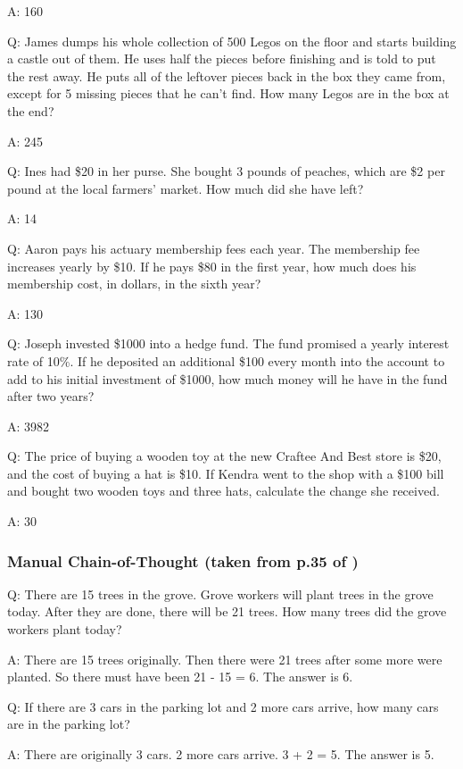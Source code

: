 \documentclass[11pt]{article}
\begin{document}
A: 160

Q: James dumps his whole collection of 500 Legos on the floor and starts building a castle out of them.  He uses half the pieces before finishing and is told to put the rest away.  He puts all of the leftover pieces back in the box they came from, except for 5 missing pieces that he can't find.  How many Legos are in the box at the end?

A: 245

Q: Ines had \$20 in her purse. She bought 3 pounds of peaches, which are \$2 per pound at the local farmers' market. How much did she have left?

A: 14

Q: Aaron pays his actuary membership fees each year. The membership fee increases yearly by \$10. If he pays \$80 in the first year, how much does his membership cost, in dollars, in the sixth year?

A: 130

Q: Joseph invested \$1000 into a hedge fund. The fund promised a yearly interest rate of 10\%. If he deposited an additional \$100 every month into the account to add to his initial investment of \$1000, how much money will he have in the fund after two years?

A: 3982

Q: The price of buying a wooden toy at the new Craftee And Best store is \$20, and the cost of buying a hat is \$10. If Kendra went to the shop with a \$100 bill and bought two wooden toys and three hats, calculate the change she received.

A: 30

\subsubsection*{Manual Chain-of-Thought (taken from p.35 of \citealp{wei_chain--thought_nodate})}

Q: There are 15 trees in the grove. Grove workers will plant trees in the grove today. After they are done, there
will be 21 trees. How many trees did the grove workers plant today?

A: There are 15 trees originally. Then there were 21 trees after some more were planted. So there must have
been 21 - 15 = 6. The answer is 6.

Q: If there are 3 cars in the parking lot and 2 more cars arrive, how many cars are in the parking lot?

A: There are originally 3 cars. 2 more cars arrive. 3 + 2 = 5. The answer is 5.
\end{document}
